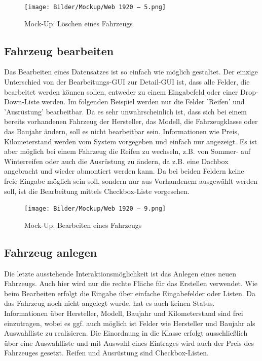 \begin{figure}[!ht]
    \centering
    \texttt{[image: Bilder/Mockup/Web 1920 – 5.png]}
    \caption{Mock-Up: Löschen eines Fahrzeugs}
    \label{mu:loeschen}
\end{figure}

\newpage

\subsection{Fahrzeug bearbeiten}

Das Bearbeiten eines Datensatzes ist so einfach wie möglich gestaltet. Der einzige Unterschied von der Bearbeitungs-GUI zur Detail-GUI ist, dass alle Felder, die bearbeitet werden können sollen, entweder zu einem Eingabefeld oder einer Drop-Down-Liste werden. Im folgenden Beispiel werden nur die Felder 'Reifen' und 'Ausrüstung' bearbeitbar. Da es sehr unwahrscheinlich ist, dass sich bei einem bereits vorhandenen Fahrzeug der Hersteller, das Modell, die Fahrzeugklasse oder das Baujahr ändern, soll es nicht bearbeitbar sein. Informationen wie Preis, Kilometerstand werden vom System vorgegeben und einfach nur angezeigt. Es ist aber möglich bei einem Fahrzeug die Reifen zu wechseln, z.B. von Sommer- auf Winterreifen oder auch die Ausrüstung zu ändern, da z.B. eine Dachbox angebracht und wieder abmontiert werden kann. Da bei beiden Feldern keine freie Eingabe möglich sein soll, sondern nur aus Vorhandenem ausgewählt werden soll, ist die Bearbeitung mittels Checkbox-Liste vorgesehen. 


\begin{figure}[!ht]
    \centering
    \texttt{[image: Bilder/Mockup/Web 1920 – 9.png]}
    \caption{Mock-Up: Bearbeiten eines Fahrzeugs}
    \label{mu:bearbeiten}
\end{figure}

\newpage

\subsection{Fahrzeug anlegen}

Die letzte ausstehende Interaktionsmöglichkeit ist das Anlegen eines neuen Fahrzeugs. Auch hier wird nur die rechte Fläche für das Erstellen verwendet. Wie beim Bearbeiten erfolgt die Eingabe über einfache Eingabefelder oder Listen. Da das Fahrzeug noch nicht angelegt wurde, hat es auch keinen Status. Informationen über Hersteller, Modell, Baujahr und Kilometerstand sind frei einzutragen, wobei es ggf. auch möglich ist Felder wie Hersteller und Baujahr als Auswahlliste zu realisieren. Die Einordnung in die Klasse erfolgt ausschließlich über eine Auswahlliste und mit Auswahl eines Eintrages wird auch der Preis des Fahrzeuges gesetzt. Reifen und Ausrüstung sind Checkbox-Listen. 

